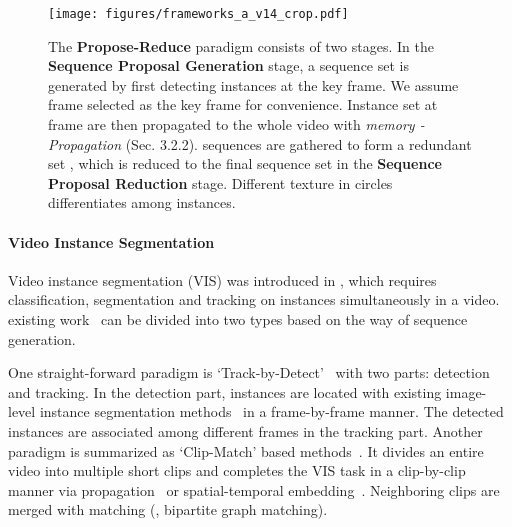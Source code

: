 \documentclass[10pt,twocolumn,letterpaper]{article}
\begin{document}
	\begin{figure*}[t]
		\begin{center}
			\texttt{[image: figures/frameworks\_a\_v14\_crop.pdf]}
		\end{center}
		\caption{The \textbf{Propose-Reduce} paradigm consists of two stages. 
			In the \textbf{Sequence Proposal Generation} stage, a sequence set  is generated by first detecting  instances at the  key frame. We assume frame  selected as the  key frame for convenience. Instance set  at frame  are then propagated to the whole video with \textit{memory -Propagation} (Sec. 3.2.2).  sequences  are gathered to form a redundant set , which is reduced to the final sequence set  in the \textbf{Sequence Proposal Reduction} stage. Different texture in circles differentiates among instances.}
		\label{fig:framework_a}
	\end{figure*}
	
	\paragraph{Video Instance Segmentation}
	Video instance segmentation (VIS) was introduced in \cite{yang2019vis}, which requires classification, segmentation and tracking on instances simultaneously in a video. existing work~\cite{yang2019vis,cao2020sipmask,athar2020stem,bertasius2020maskprop,luiten2020unovost,lin2020video} can be divided into two types based on the way of sequence generation.
	
	One straight-forward paradigm is `Track-by-Detect'~\cite{yang2019vis,cao2020sipmask,luiten2020unovost} with two parts: detection and tracking. In the detection part, instances are located with existing image-level instance segmentation methods~\cite{he2017mask} in a frame-by-frame manner. The detected instances are associated among different frames in the tracking part.
	Another paradigm is summarized as `Clip-Match' based methods~\cite{athar2020stem,bertasius2020maskprop}. It divides an entire video into multiple short clips and completes the VIS task in a clip-by-clip manner via propagation~\cite{bertasius2020maskprop} or spatial-temporal embedding~\cite{athar2020stem}. Neighboring clips are merged with matching (\eg, bipartite graph matching). 
	
	\vspace{-0.05in}
	
\end{document}
